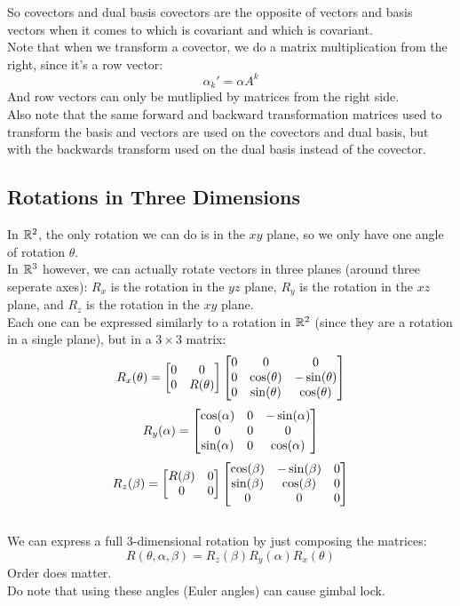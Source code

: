 \documentclass[12pt]{article}
\begin{document}
So covectors and dual basis covectors
are the opposite of vectors and basis vectors
when it comes to which is covariant and
which is covariant. \\

Note that when we transform a covector,
we do a matrix multiplication from
the right, since it's a row vector:
\[ \alpha_k' = \alpha A^k \]
And row vectors can only be mutliplied
by matrices from the right side. \\

Also note that the same forward and backward
transformation matrices used to transform
the basis and vectors are used 
on the covectors and dual basis,
but with the backwards transform used
on the dual basis instead of the covector. \\

\newpage

\subsection*{Rotations in Three Dimensions}

In $\mathbb{R}^2$,
the only rotation we can do is in the $xy$ plane,
so we only have one angle of rotation $\theta$. \\

In $\mathbb{R}^3$ however,
we can actually rotate vectors in three planes
(around three seperate axes):
$R_x$ is the rotation in the $yz$ plane,
$R_y$ is the rotation in the $xz$ plane,
and $R_z$ is the rotation in the $xy$ plane. \\

Each one can be expressed similarly to 
a rotation in $\mathbb{R}^2$ (since they are a rotation
in a single plane), but in a $3\times 3$ matrix:
\[ R_x(\theta) = \begin{bmatrix} {0}&{0}\\{0}&{R(\theta)} \end{bmatrix}
\begin{bmatrix} {0}&{0}&{0}\\{0}&{\cos(\theta)}&
{-\sin(\theta)}\\{0}&{\sin(\theta)}&{\cos(\theta)} \end{bmatrix} \]
\[ R_y(\alpha) =
\begin{bmatrix} {\cos(\alpha)}&{0}&{-\sin(\alpha)}\\{0}&{0}&
{0}\\{\sin(\alpha)}&{0}&{\cos(\alpha)} \end{bmatrix} \]
\[ R_z(\beta) = \begin{bmatrix} {R(\beta)}&{0}\\{0}&{0} \end{bmatrix}
\begin{bmatrix} {\cos(\beta)}&{-\sin(\beta)}&{0}\\
{\sin(\beta)}&{\cos(\beta)}&
{0}\\{0}&{0}&{0} \end{bmatrix} \] \\

We can express a full $3$-dimensional rotation
by just composing the matrices:
\[ R(\theta, \alpha, \beta) = 
R_z(\beta)R_y(\alpha)R_x(\theta) \]
Order does matter. \\
Do note that using these angles 
(Euler angles) can cause gimbal lock. \\
\end{document}
